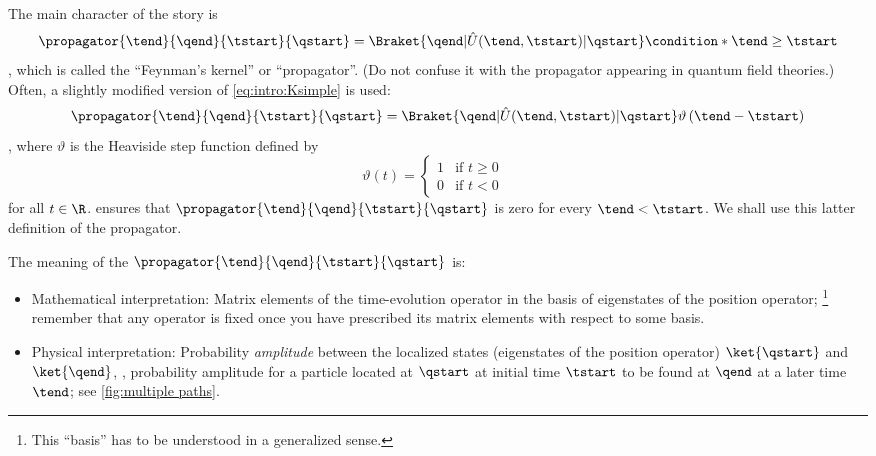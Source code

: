 The   main character of
the story is
\begin{dmath}[label={intro:Ksimple}]
   \propagator{\tend}{\qend}{\tstart}{\qstart} 
   = 
   \Braket{ \qend| \hat{U} (\tend,\tstart) | \qstart}
   \condition*{\tend \geq \tstart}
\end{dmath},
which is called the ``Feynman's kernel'' or ``propagator''. (Do not confuse it
with the propagator appearing in quantum field theories.)
Often, a slightly modified version of \cref{eq:intro:Ksimple} is used:
\begin{dmath}[label={intro:K}]
   \propagator{\tend}{\qend}{\tstart}{\qstart} 
   = 
   \Braket{ \qend| \hat{U} (\tend,\tstart) | \qstart}
   \vartheta\left( \tend -\tstart \right)
\end{dmath},
where $\vartheta$ is the Heaviside step function defined by 
\begin{dmath*}
   \vartheta( t) = 
   \begin{cases}
      1  & \textrm{if $t \geq 0$ }  \\
      0  & \textrm{if $t<0$ }
   \end{cases}
\end{dmath*}
for all $t\in\R$.
 ensures that 
$\propagator{\tend}{\qend}{\tstart}{\qstart}$ is zero for every $\tend <
\tstart$. We shall use this latter definition of the propagator.

The  meaning of the 
$\propagator{\tend}{\qend}{\tstart}{\qstart}$  is:
\begin{itemize}
   \item Mathematical interpretation: Matrix elements of the time-evolution
      operator in the basis of eigenstates of the position operator;%
      \footnote{This ``basis'' has to be understood in a generalized sense.}
      remember that any operator is fixed once you have prescribed its matrix
      elements with respect to some basis.
   \item Physical interpretation: Probability \emph{amplitude} 
      between the localized states (eigenstates of the position operator)
      $\ket{\qstart}$ and $\ket{\qend}$, \ie, probability amplitude for a
      particle located at $\qstart$ at initial time $\tstart$ to be found at
      $\qend$ at a later time $\tend$; see \cref{fig:multiple paths}.
\end{itemize}

